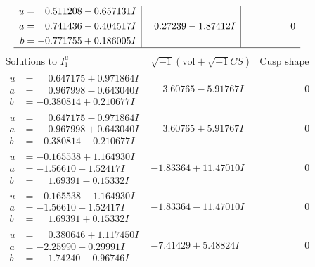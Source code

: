 \documentclass[1p]{elsarticle_modified}
\theoremstyle{definition}
\newcommand{\I}{\sqrt{-1}}
\begin{document}
$$\begin{array}{c|c|c}
\begin{aligned}
u &= \phantom{-}0.511208 - 0.657131 I \\
a &= \phantom{-}0.741436 - 0.404517 I \\
b &= -0.771755 + 0.186005 I\end{aligned}
 & \phantom{-}0.27239 - 1.87412 I & \phantom{-0.000000 } 0\\
 \hline 
 \end{array}$$\newpage$$\begin{array}{c|c|c}  
\text{Solutions to }I^u_{1}& \I (\text{vol} + \sqrt{-1}CS) & \text{Cusp shape}\\
 \hline 
\begin{aligned}
u &= \phantom{-}0.647175 + 0.971864 I \\
a &= \phantom{-}0.967998 - 0.643040 I \\
b &= -0.380814 + 0.210677 I\end{aligned}
 & \phantom{-}3.60765 - 5.91767 I & \phantom{-0.000000 } 0 \\ \hline\begin{aligned}
u &= \phantom{-}0.647175 - 0.971864 I \\
a &= \phantom{-}0.967998 + 0.643040 I \\
b &= -0.380814 - 0.210677 I\end{aligned}
 & \phantom{-}3.60765 + 5.91767 I & \phantom{-0.000000 } 0 \\ \hline\begin{aligned}
u &= -0.165538 + 1.164930 I \\
a &= -1.56610 + 1.52417 I \\
b &= \phantom{-}1.69391 - 0.15332 I\end{aligned}
 & -1.83364 + 11.47010 I & \phantom{-0.000000 } 0 \\ \hline\begin{aligned}
u &= -0.165538 - 1.164930 I \\
a &= -1.56610 - 1.52417 I \\
b &= \phantom{-}1.69391 + 0.15332 I\end{aligned}
 & -1.83364 - 11.47010 I & \phantom{-0.000000 } 0 \\ \hline\begin{aligned}
u &= \phantom{-}0.380646 + 1.117450 I \\
a &= -2.25990 - 0.29991 I \\
b &= \phantom{-}1.74240 - 0.96746 I\end{aligned}
 & -7.41429 + 5.48824 I & \phantom{-0.000000 } 0 \\ \hline\begin{aligned}

\end{aligned}
\end{array}$$
\end{document}
